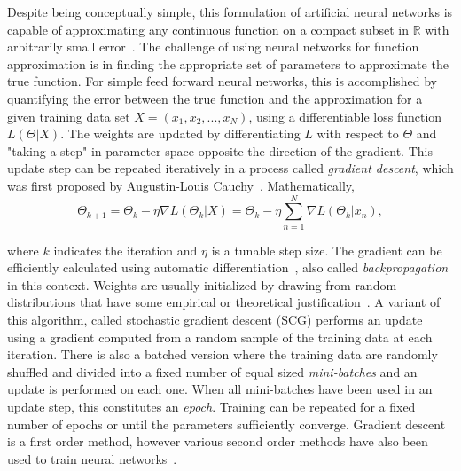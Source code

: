 Despite being conceptually simple, this formulation of artificial neural networks is capable of approximating any continuous function on a compact subset in $\mathbb{R}$ with arbitrarily small error~\cite{cybenko1989}.
The challenge of using neural networks for function approximation is in finding the appropriate set of parameters to approximate the true function.
For simple feed forward neural networks, this is accomplished by quantifying the error between the true function and the approximation for a given training data set $X=(x_1, x_2, ..., x_N)$, using a differentiable loss function $L(\Theta | X)$. 
The weights are updated by differentiating $L$ with respect to $\Theta$ and "taking a step" in parameter space opposite the direction of the gradient. 
This update step can be repeated iteratively in a process called \textit{gradient descent}, which was first proposed by Augustin-Louis Cauchy~\cite{cauchy1847}.
Mathematically, 
\begin{equation}
\Theta_{k+1} = \Theta_k - \eta \nabla L(\Theta_k | X) = \Theta_k - \eta \sum_{n=1}^{N} \nabla L(\Theta_k | x_n),
\label{eq:batch_gd}
\end{equation}

\noindent
where $k$ indicates the iteration and $\eta$ is a tunable step size.
The gradient can be efficiently calculated using automatic differentiation~\cite{linnainmaa1976}, also called \textit{backpropagation} in this context.
Weights are usually initialized by drawing from random distributions that have some empirical or theoretical justification~\cite{glorot2010}.
A variant of this algorithm, called stochastic gradient descent (SCG) performs an update using a gradient computed from a random sample of the training data at each iteration.
There is also a batched version where the training data are randomly shuffled and divided into a fixed number of equal sized \textit{mini-batches} and an update is performed on each one. 
When all mini-batches have been used in an update step, this constitutes an \textit{epoch}.
Training can be repeated for a fixed number of epochs or until the parameters sufficiently converge.
Gradient descent is a first order method, however various second order methods have also been used to train neural networks~\cite{fletcher1964, polak1969, moller1993, marquardt1963}.

